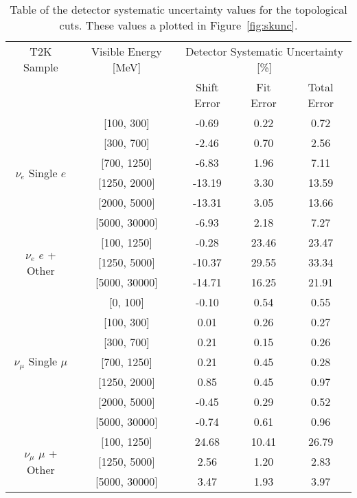 \begin{table}[h]
  \centering
  \begin{tabular}{|c | c | c | c | c|}
    \hline\hline
    T2K Sample & Visible Energy [MeV] & \multicolumn{3}{|c|}{Detector Systematic Uncertainty [\%]} \\
    \cline{3-5}
    & & Shift Error & Fit Error & Total Error \\
    \hline
      \multirow{6}{*}{$\nu_{e}$ Single $e$}
       & [100, 300] &    -0.69  & 0.22 & 0.72   \\ 
       & [300, 700] &    -2.46  & 0.70 & 2.56   \\ 
       & [700, 1250] &   -6.83  & 1.96 & 7.11   \\ 
       & [1250, 2000] &  -13.19 & 3.30 & 13.59 \\ 
       & [2000, 5000] &  -13.31 & 3.05 & 13.66  \\ 
       & [5000, 30000] & -6.93  & 2.18 & 7.27   \\ 
      \hline
      \multirow{3}{*}{$\nu_{e}$ $e$ + Other}
       & [100, 1250] & -0.28  & 23.46 &  23.47    \\ 
       & [1250, 5000] & -10.37  & 29.55 &  33.34   \\ 
       & [5000, 30000] & -14.71  & 16.25 &  21.91  \\ 
      \hline
      \multirow{7}{*}{$\nu_{\mu}$ Single $\mu$}
       & [0, 100] &     -0.10    & 0.54  & 0.55  \\ 
       & [100, 300] &    0.01    & 0.26  &  0.27  \\ 
       & [300, 700] &    0.21    & 0.15  &  0.26  \\ 
       & [700, 1250] &   0.21    & 0.45  & 0.28   \\ 
       & [1250, 2000] &  0.85  & 0.45  & 0.97   \\ 
       & [2000, 5000] &  -0.45  & 0.29  & 0.52   \\ 
       & [5000, 30000] & -0.74  & 0.61  & 0.96   \\ 
      \hline
      \multirow{3}{*}{$\nu_{\mu}$ $\mu$ + Other}
       & [100, 1250] &   24.68   & 10.41 &  26.79  \\ 
       & [1250, 5000] &   2.56   & 1.20 & 2.83 \\ 
       & [5000, 30000] &   3.47  & 1.93 & 3.97  \\ 
      \hline
  \end{tabular}
  \caption{Table of the detector systematic uncertainty values for the
  topological cuts. These values a plotted in Figure~\ref{fig:skunc}.}
  \label{tab:skerr}
\end{table}


